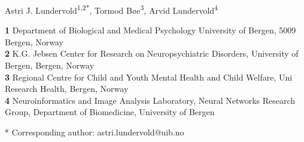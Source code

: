 \documentclass[10pt,letterpaper]{article}
\date{}
\begin{document}
\vspace*{0.2in}

\begin{flushleft}
{\Large
\textbf{} %
}
\newline

Astri J. Lundervold\textsuperscript{1,2*},
Tormod B\o{}e\textsuperscript{3},
Arvid Lundervold\textsuperscript{4}


\bigskip
\textbf{1} Department of Biological and Medical Psychology University of Bergen, 5009 Bergen, Norway
\\
\textbf{2} K.G. Jebsen Center for Research on Neuropsychiatric Disorders, University of Bergen, Bergen, Norway\\
\textbf{3} Regional Centre for Child and Youth Mental Health and Child Welfare, Uni Research Health, Bergen, Norway\\
\textbf{4} Neuroinformatics and Image Analysis Laboratory, Neural Networks Research Group, Department of Biomedicine, University of Bergen
\\
\bigskip

% 
%





* Corresponding author: astri.lundervold@uib.no

\end{flushleft}
\end{document}
